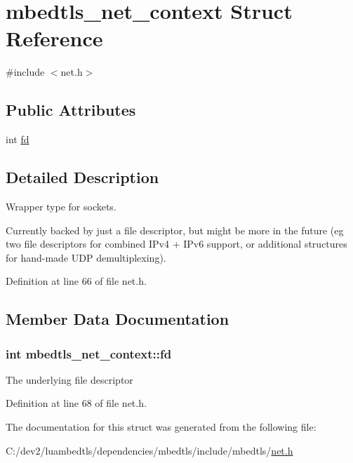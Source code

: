 \hypertarget{structmbedtls__net__context}{\section{mbedtls\-\_\-net\-\_\-context Struct Reference}
\label{structmbedtls__net__context}
}


{\ttfamily \#include $<$net.\-h$>$}

\subsection*{Public Attributes}
\begin{DoxyCompactItemize}
\item 
int \hyperlink{structmbedtls__net__context_ad6eda44e3bfee722150d12a591408995}{fd}
\end{DoxyCompactItemize}


\subsection{Detailed Description}
Wrapper type for sockets.

Currently backed by just a file descriptor, but might be more in the future (eg two file descriptors for combined I\-Pv4 + I\-Pv6 support, or additional structures for hand-\/made U\-D\-P demultiplexing). 

Definition at line 66 of file net.\-h.



\subsection{Member Data Documentation}
\hypertarget{structmbedtls__net__context_ad6eda44e3bfee722150d12a591408995}{
\subsubsection[{fd}]{\setlength{\rightskip}{0pt plus 5cm}int mbedtls\-\_\-net\-\_\-context\-::fd}}\label{structmbedtls__net__context_ad6eda44e3bfee722150d12a591408995}
The underlying file descriptor 

Definition at line 68 of file net.\-h.



The documentation for this struct was generated from the following file\-:\begin{DoxyCompactItemize}
\item 
C\-:/dev2/luambedtls/dependencies/mbedtls/include/mbedtls/\hyperlink{net_8h}{net.\-h}\end{DoxyCompactItemize}

